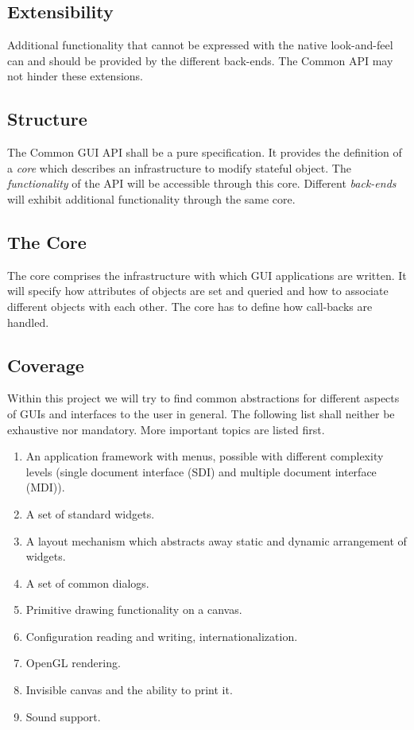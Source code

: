 \documentclass{article}
\begin{document}
\subsection{Extensibility}
Additional functionality that cannot be expressed with the native
look-and-feel can and should be provided by the different back-ends.
The Common API may not hinder these extensions.

\subsection{Structure}
The Common GUI API shall be a pure specification. It provides the
definition of a \emph{core} which describes an infrastructure to
modify stateful object. The \emph{functionality} of the API will be
accessible through this core. Different \emph{back-ends} will exhibit
additional functionality through the same core.
 
\subsection{The Core}
The core comprises the infrastructure with which GUI applications are
written. It will specify how attributes of objects are set and queried
and how to associate different objects with each other. The core has
to define how call-backs are handled.

\subsection{Coverage}
Within this project we will try to find common abstractions for
different aspects of GUIs and interfaces to the user in general. The
following list shall neither be exhaustive nor mandatory. More
important topics are listed first.
\begin{enumerate}
\item An application framework with menus, possible with different
  complexity levels (single document interface (SDI) and multiple
  document interface (MDI)).
\item A set of standard widgets.
\item A layout mechanism which abstracts away static and dynamic
  arrangement of widgets.
\item A set of common dialogs.
\item Primitive drawing functionality on a canvas.
\item Configuration reading and writing, internationalization.
\item OpenGL rendering.
\item Invisible canvas and the ability to print it.
\item Sound support.
\end{enumerate}
\end{document}
